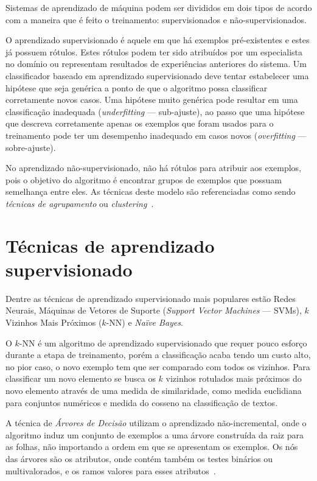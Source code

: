 Sistemas de aprendizado de máquina podem ser divididos em dois tipos de acordo com a maneira que é feito o treinamento: supervisionados e não-supervisionados.

O aprendizado supervisionado é aquele em que há exemplos pré-existentes e estes já possuem rótulos. Estes rótulos podem ter sido atribuídos por um especialista no domínio ou representam resultados de experiências anteriores do sistema. Um classificador baseado em aprendizado supervisionado deve tentar estabelecer uma hipótese que seja genérica a ponto de que o algoritmo possa classificar corretamente novos casos. Uma hipótese muito genérica pode resultar em uma classificação inadequada (\emph{underfitting} --- sub-ajuste), ao passo que uma hipótese que descreva corretamente apenas os exemplos que foram usados para o treinamento pode ter um desempenho inadequado em casos novos (\emph{overfitting} --- sobre-ajuste).

No aprendizado não-supervisionado, não há rótulos para atribuir aos exemplos, pois o objetivo do algoritmo é encontrar grupos de exemplos que possuam semelhança entre eles. As técnicas deste modelo são referenciadas como sendo \emph{técnicas de agrupamento} ou \emph{clustering}~\cite{rezende2003sistemas}.

\section{Técnicas de aprendizado supervisionado}

Dentre as técnicas de aprendizado supervisionado mais populares estão Redes Neurais, Máquinas de Vetores de Suporte (\emph{Support Vector Machines} --- SVMs), $k$ Vizinhos Mais Próximos ($k$-NN) e \emph{Naïve Bayes}.


O $k$-NN é um algoritmo de aprendizado supervisionado que requer pouco esforço durante a etapa de treinamento, porém a classificação acaba tendo um custo alto, no pior caso, o novo exemplo tem que ser comparado com todos os vizinhos. Para classificar um novo elemento se busca os $k$ vizinhos rotulados mais próximos do novo elemento através de uma medida de similaridade, como medida euclidiana \cite{ferrero-algoritmo} para conjuntos numéricos e medida do cosseno \cite{tan2006effective} na classificação de textos.

A técnica de \emph{Árvores de Decisão} utilizam o aprendizado não-incremental, onde o algoritmo induz um conjunto de exemplos a uma árvore construída da raiz para as folhas, não importando a ordem em que se apresentam os exemplos. Os nós das árvores são os atributos, onde contém também os testes binários ou multivalorados, e os ramos valores para esses atributos~\cite{de-categorizacao}.


